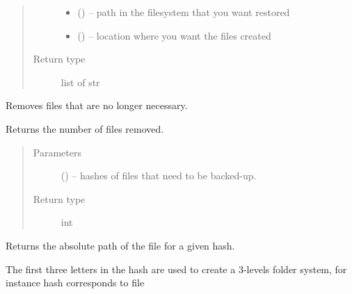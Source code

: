 \documentclass[letterpaper,10pt,english]{sphinxmanual}
\begin{document}
\begin{fulllineitems}
\begin{fulllineitems}
\begin{quote}
\begin{description}
\begin{itemize}
\item {} 
 () -- path in the filesystem that you want restored

\item {} 
 () -- location where you want the files created

\end{itemize}

\item[{Return type}] \leavevmode
list of str

\end{description}\end{quote}

\end{fulllineitems}


\begin{fulllineitems}
\label{\detokenize{index:fsbackup.hashVolume.HashVolume.cleanOldHashes}}
Removes files that are no longer necessary.

Returns the number of files removed.
\begin{quote}\begin{description}
\item[{Parameters}] \leavevmode
{} () -- hashes of files that need to be backed-up.

\item[{Return type}] \leavevmode
int

\end{description}\end{quote}

\end{fulllineitems}


\begin{fulllineitems}
\label{\detokenize{index:fsbackup.hashVolume.HashVolume.fnForHash}}
Returns the absolute path of the file for a given hash.

The first three letters in the hash are used to create a 3-levels folder system,
for instance hash 
corresponds to file
\begin{quote}


\end{quote}
\end{fulllineitems}
\end{fulllineitems}
\end{document}
